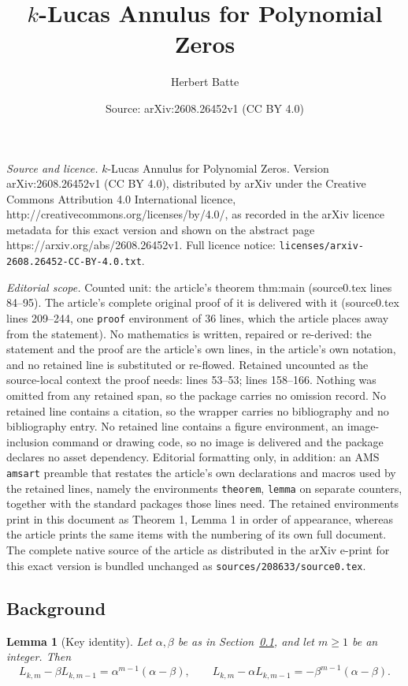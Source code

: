 \documentclass[10pt,a4paper]{amsart}
\title{$k$-Lucas Annulus for Polynomial Zeros}
\author{Herbert Batte}
\date{Source: arXiv:2608.26452v1 (CC BY 4.0)}
\newtheorem{lemma}{Lemma}
\begin{document}
\maketitle

\noindent\emph{Source and licence.} $k$-Lucas Annulus for Polynomial Zeros. Version arXiv:2608.26452v1 (CC BY 4.0), distributed by arXiv under the Creative Commons Attribution 4.0 International licence, http://creativecommons.org/licenses/by/4.0/, as recorded in the arXiv licence metadata for this exact version and shown on the abstract page https://arxiv.org/abs/2608.26452v1. Full licence notice: \texttt{licenses/arxiv-2608.26452-CC-BY-4.0.txt}.\par\smallskip

\noindent\textit{Editorial scope.} Counted unit: the article's theorem thm:main (source0.tex lines 84--95). The article's complete original proof of it is delivered with it (source0.tex lines 209--244, one \texttt{proof} environment of 36 lines, which the article places away from the statement). No mathematics is written, repaired or re-derived: the statement and the proof are the article's own lines, in the article's own notation, and no retained line is substituted or re-flowed.  Retained uncounted as the source-local context the proof needs: lines 53--53; lines 158--166.  Nothing was omitted from any retained span, so the package carries no omission record.  No retained line contains a citation, so the wrapper carries no bibliography and no bibliography entry.  No retained line contains a figure environment, an image-inclusion command or drawing code, so no image is delivered and the package declares no asset dependency.  Editorial formatting only, in addition: an AMS \texttt{amsart} preamble that restates the article's own declarations and macros used by the retained lines, namely the environments \texttt{theorem}, \texttt{lemma} on separate counters, together with the standard packages those lines need.  The retained environments print in this document as Theorem 1, Lemma 1 in order of appearance, whereas the article prints the same items with the numbering of its own full document.  The complete native source of the article as distributed in the arXiv e-print for this exact version is bundled unchanged as \texttt{sources/208633/source0.tex}.
\subsection{Background}\label{sec:background}

\begin{lemma}[Key identity]
	\label{lem:key}
Let $\alpha,\beta$ be as in Section~\ref{sec:background}, and let $m\ge1$ be an integer. Then
	\[
	L_{k,m}-\beta L_{k,m-1}=\alpha^{m-1}(\alpha-\beta),
	\qquad
	L_{k,m}-\alpha L_{k,m-1}=-\beta^{m-1}(\alpha-\beta).
	\]
\end{lemma}
\end{document}
